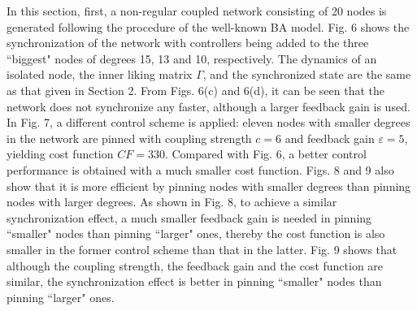 \documentclass[11pt]{article}
\begin{document}
\quad In this section, first, a non-regular coupled network
consisting of 20 nodes is generated following the procedure of the
well-known BA model. Fig. 6 shows the synchronization of the network
with controllers being added to the three ``biggest" nodes of
degrees 15, 13 and 10, respectively. The dynamics of an isolated
node, the inner liking matrix $\Gamma$, and the synchronized state
are the same as that given in Section 2. From Figs. 6(c) and 6(d),
it can be seen that the network does not synchronize any faster,
although a larger feedback gain is used. In Fig. 7, a different
control scheme is applied: eleven nodes with smaller degrees in the
network are pinned with coupling strength $c=6$ and feedback gain
$\varepsilon=5$, yielding cost function $CF=330$. Compared with Fig.
6, a better control performance is obtained with a much smaller cost
function. Figs. 8 and 9 also show that it is more efficient by
pinning nodes with smaller degrees than pinning nodes with larger
degrees. As shown in Fig. 8, to achieve a similar synchronization
effect, a much smaller feedback gain is needed in pinning ``smaller"
nodes than pinning ``larger" ones, thereby the cost function is also
smaller in the former control scheme than that in the latter. Fig. 9
shows that although the coupling strength, the feedback gain and the
cost function are similar, the synchronization effect is better in
pinning ``smaller" nodes than pinning ``larger" ones.
\begin{center}
\quad \unitlength=1cm \hbox{\hspace*{0.1cm} 
 \quad {}
 }
\end{center}
\vskip-0.6cm \qquad\qquad\qquad\qquad{}
\begin{center}
\quad \unitlength=1cm \hbox{\hspace*{0.1cm} 
 \quad {}
 }
\end{center}
\vskip-0.6cm \qquad\qquad\qquad\qquad{}
\vskip0.1cm 
\end{document}
